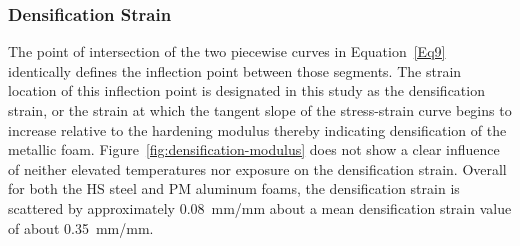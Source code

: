\documentclass[review]{elsarticle}
\begin{document}
\subsubsection{Densification Strain}

The point of intersection of the two piecewise curves in Equation~\ref{Eq9} identically defines the inflection point between those segments. The strain location of this inflection point is designated in this study as the densification strain, or the strain at which the tangent slope of the stress-strain curve begins to increase relative to the hardening modulus thereby indicating densification of the metallic foam. Figure~\ref{fig:densification-modulus} does not show a clear influence of neither elevated temperatures nor exposure on the densification strain. Overall for both the HS steel and PM aluminum foams, the densification strain is scattered by approximately 0.08~mm/mm about a mean densification strain value of about 0.35~mm/mm.
\end{document}
